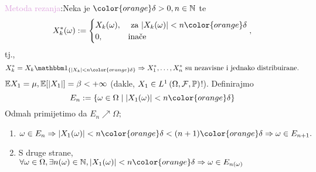 \documentclass{article}
\begin{document}
\textcolor{Plum}{Metoda rezanja}:\newline Neka je \({\color{orange}\delta>0},n\in\Bbb N\) te \[X^*_k(\omega):=\begin{cases}X_k(\omega),&\text{ za }|X_k(\omega)|<n{\color{orange}\delta}\\0,&\text{inače}\end{cases},\] tj., \[X^*_k=X_k\mathbbm 1_{\left\{|X_k|<n{\color{orange}\delta}\right\}}\Rightarrow X^*_1,\ldots,X^*_n\text{ su nezavisne i jednako distribuirane}.\]  \(\Bbb EX_1=\mu,\Bbb E[|X_1|]=\beta<+\infty\) (dakle, \(X_1\in L^1\left(\Omega,\mathcal F,\Bbb P\right)\)!). Definirajmo \[E_n:=\left\{\omega\in\Omega\mid |X_1(\omega)|<n{\color{orange}\delta}\right\}\] Odmah primijetimo da \(E_n\nearrow\Omega;\)\begin{enumerate}
    \item[] \(\omega\in E_n\Rightarrow|X_1(\omega)|<n{\color{orange}\delta}<(n+1){\color{orange}\delta}\Rightarrow\omega\in E_{n+1}.\) 
    \item[] S druge strane, \(\forall\omega\in\Omega,\exists n(\omega)\in\Bbb N,|X_1(\omega)|<n{\color{orange}\delta}\Rightarrow\omega\in E_{n(\omega)}\) 

\end{enumerate}
\end{document}
